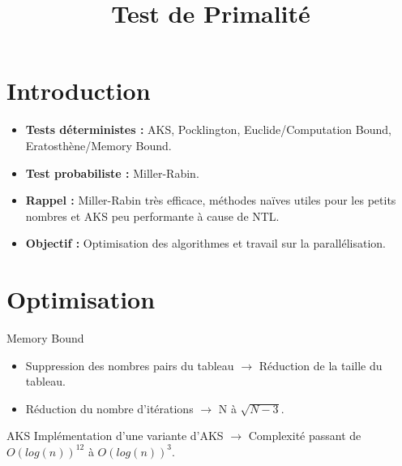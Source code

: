 
\usepackage{../tex/myInfolines}
\usepackage{graphicx}
\usepackage{algorithm}
\usepackage{algorithmic}
\usepackage{subcaption}
\usepackage{longtable,array}
\newenvironment{figure*}%
{\begin{figure}}
{\end{figure}}
\title{Test de Primalité}


	\begin{frame}
		\titlepage
	\end{frame}
	
	\section*{Introduction}
        \begin{frame}
        \begin{itemize}
        \item \textbf{Tests déterministes :} AKS, Pocklington, Euclide/Computation Bound, Eratosthène/Memory Bound.
        \vspace{1.5em}
        \item \textbf{Test probabiliste :} Miller-Rabin.
        \vspace{1.5em}
        \item \textbf{Rappel :} Miller-Rabin très efficace, méthodes naïves utiles pour les petits nombres et AKS peu performante à cause de NTL.
        \vspace{1.5em}
        \item \textbf{Objectif :} Optimisation des algorithmes et travail sur la parallélisation.
        \end{itemize}
                    
        \end{frame}

	\begin{frame}
		\tableofcontents
	\end{frame}
	
	\section{Optimisation}
	\begin{frame}	
 		  \begin{block}{Memory Bound}
   \begin{itemize}
\item Suppression des nombres pairs du tableau $\rightarrow$ Réduction de la taille du tableau.
\item Réduction du nombre d'itérations $\rightarrow$ N à $\sqrt{N-3}$.
\end{itemize}
   \end{block}
   \vspace{2em}
   \begin{block}{AKS}
   Implémentation d'une variante d'AKS $\rightarrow$ Complexité passant de $O(log(n))^{12}$ à $O(log(n))^{3}$.
    \end{block}
	\end{frame}
	
